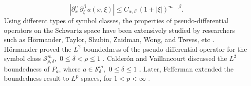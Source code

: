 \documentclass[12pt,a4paper,reqno]{amsproc}
\theoremstyle{definition}
\theoremstyle{remark}
\numberwithin{equation}{section}
\begin{document}
\begin{equation*}
|\partial_x^\alpha\,\partial_\xi^\beta\,a(x,\xi)| \le C_{\alpha,\beta}\,(1+|\xi|)^{m-\beta}.
\end{equation*}
Using different types of symbol classes, the properties of pseudo-differential operators on the Schwartz space have been extensively studied by researchers such as H\"ormander, Taylor, Shubin, Zaidman, Wong, and Treves, etc \cite{Hormander, Wong, Zaidman, Cardona, Ruzhansky, Ruzhansky1}. H\"ormander proved the $L^2$ boundedness of the pseudo-differential operator for the symbol class $\mathcal{S}^m_{\rho,\delta}, \,\, 0\le \delta<\rho\le1$ \cite{HormanderL}.  Calder\'on and Vaillancourt discussed the $L^2$ boundedness of $P_a$, where $a\in \mathcal{S}^m_{\delta},\,\, 0\le \delta\le1$ \cite{Vaillancourt}. Later, Fefferman extended the boundedness result to $L^p$ spaces, for $1<p<\infty$ \cite{Fefferman}.
\end{document}
